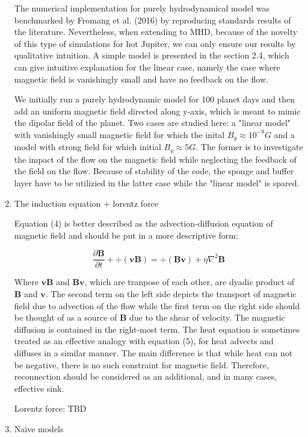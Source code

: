 \documentclass[11pt]{article}
\begin{document}
\begin{enumerate}
The numerical implementation for purely hydrodynamical model was benchmarked by Fromang et al. (2016) by reproducing standards results of the literature. Nevertheless, when extending to MHD, because of the novelty of this type of simulations for hot Jupiter, we can only ensure our results by qualitative intuition. A simple model is presented in the section 2.4, which can give intuitive explanation for the linear case, namely the case where magnetic field is vanishingly small and have no feedback on the flow. 

We initially run a purely hydrodynamic model for 100 planet days and then add an uniform magnetic field directed along y-axis, which is meant to mimic the dipolar field of the planet. Two cases are studied here: a "linear model" with vanishingly small magnetic field for which the inital $B_y \approx 10^{-9} G$  and a model with strong field for which initial $B_y \approx 5G $. The former is to investigate the impact of the flow on the magnetic field while neglecting the feedback of the field on the flow. Because of stability of the code, the sponge and buffer layer have to be utilizied in the latter case while the "linear model" is spared.

\item The induction equation + lorentz force 

Equation (4) is better described as the advection-diffusion equation of magnetic field and should be put in a more descriptive form: 

\begin{equation}
\frac{\partial \bm{B}}{\partial t} + \div (\bm{v}\bm{B})   = \div(\bm{B}\bm{v}) + \eta \nabla^2 \bm{B}
\end{equation}

Where $\bm{v}\bm{B}$ and $\bm{B}\bm{v}$, which are tranpose of each other, are dyadic product of $\bm{B}$ and $\bm{v}$. The second term on the left side depicts the transport of magnetic field due to advection of the flow while the first term on the right side should be thought of as a source of $\bm{B}$ due to the shear of velocity. The magnetic diffusion is contained in the right-most term.  The heat equation is sometimes treated as an effective analogy with equation (5), for heat advects and diffuses in a similar manner. The main difference is that while heat can not be negative, there is no such constraint for magnetic field. Therefore, reconnection should be considered as an additional, and in many cases, effective sink. 

Lorentz force: TBD
\item Naive models


\end{enumerate}
\end{document}
